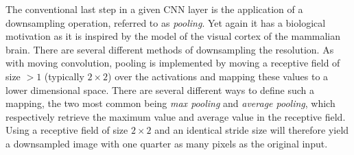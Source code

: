 The conventional last step in a given CNN layer is the application of a downsampling operation, referred to as \textit{pooling}.
Yet again it has a biological motivation as it is inspired by the model of the visual cortex of the mammalian brain.
There are several different methods of downsampling the resolution.
As with moving convolution, pooling is implemented by moving a receptive field of size $>1$ (typically $2 \times 2$) over the activations and mapping these values to a lower dimensional space.
There are several different ways to define such a mapping, the two most common being \textit{max pooling} and \textit{average pooling}, which respectively retrieve the maximum value and average value in the receptive field.
Using a receptive field of size $2 \times 2$ and an identical stride size will therefore yield a downsampled image with one quarter as many pixels as the original input.
